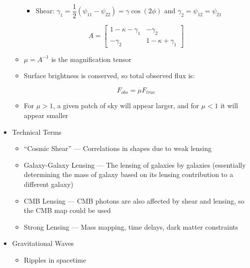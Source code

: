 \begin{itemize}
\begin{itemize}
\begin{itemize}
          \item Shear: $\gamma_1=\dfrac{1}{2}(\psi_{11}-\psi_{22})=\gamma\cos(2\phi)$ and $\gamma_2=\psi_{12}=\psi_{21}$

        \end{itemize}

        $$A=\left[ \begin{matrix} 1-\kappa-\gamma_1 & -\gamma_2\\ -\gamma_2 & 1-\kappa+\gamma_1\end{matrix} \right]$$

      \item $\mu=A^{-1}$ is the magnification tensor

      \item Surface brightness is conserved, so total observed flux is:

        $$F_{obs}=\mu F_{true}$$

      \item For $\mu>1$, a given patch of sky will appear larger, and for $\mu<1$ it will appear smaller

    \end{itemize}

  \item Technical Terms

    \begin{itemize}

      \item ``Cosmic Shear'' — Correlations in shapes due to weak lensing

      \item Galaxy-Galaxy Lensing — The lensing of galaxies by galaxies (essentially determining the mass of galaxy based on its lensing contribution to a different galaxy)

      \item CMB Lensing — CMB photons are also affected by shear and lensing, so the CMB map could be used

      \item Strong Lensing — Mass mapping, time delays, dark matter constraints

    \end{itemize}

  \item Gravitational Waves

    \begin{itemize}

      \item Ripples in spacetime


\end{itemize}
\end{itemize}
